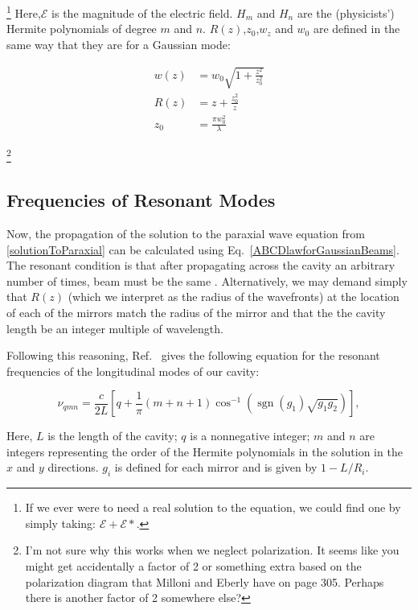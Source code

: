 \footnote{If we ever were to need a real solution to the equation, we could find one by simply taking: $\mathcal{E}+\mathcal{E}*$.}
Here,$\mathcal{E}$ is the magnitude of the electric field. $H_m$ and $H_n$ are the (physicists') Hermite polynomials of degree $m$ and $n$. $R(z)$,$z_0$,$w_z$ and $w_0$ are defined in the same way that they are for a Gaussian mode:

\begin{align}
w(z)&=w_0 \sqrt{1+\frac{z^2}{z_0^2}} \\
R(z)&=z+\frac{z_0^2}{z}\\
z_0&=\frac{\pi w_0^2}{\lambda }
\end{align}

\footnote{I'm not sure why this works when we neglect polarization. It seems like you might get accidentally a factor of 2 or something extra based on the polarization diagram that Milloni and Eberly have on page 305. Perhaps there is another factor of 2 somewhere else? }

\subsection{Frequencies of Resonant Modes}
Now, the propagation of the solution to the paraxial wave equation from \ref{solutionToParaxial} can be calculated using Eq.\ \ref{ABCDlawforGaussianBeams}. The resonant condition is that after propagating across the cavity an arbitrary number of times, beam must be the same \cite{lasersMilonniEberly}.
Alternatively, we may demand simply that $R(z)$ (which we interpret as the radius of the wavefronts) at the location of each of the mirrors match the radius of the mirror and that the the cavity length be an integer multiple of wavelength. 

Following this reasoning, Ref.\ \cite{lasersMilonniEberly} gives the following equation for the resonant frequencies of the longitudinal modes of our cavity:

\begin{equation} \label{eqModeF}
\nu_{qmn}=\frac{c}{2L}\left[q + \frac{1}{\pi}(m+n+1)\cos^{-1}(\operatorname{sgn}(g_1)\sqrt{g_1 g_2})\right], 
\end{equation}

Here, $L$ is the length of the cavity; $q$ is a nonnegative integer; $m$ and $n$ are integers representing the order of the Hermite polynomials in the solution in the $x$ and $y$ directions. $g_i$ is defined for each mirror and is given by $1-L/R_i$.

